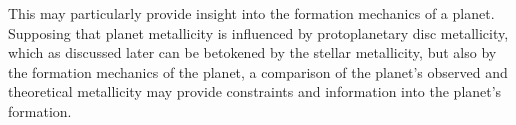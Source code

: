 \documentclass[a4paper,twocolumn,12pt]{article}
\begin{document}

This may particularly provide insight into the formation mechanics of a planet. Supposing that planet metallicity is influenced by protoplanetary disc metallicity, which as discussed later can be betokened by the stellar metallicity, but also by the formation mechanics of the planet, a comparison of the planet's observed and theoretical metallicity may provide constraints and information into the planet's formation.





\end{document}

